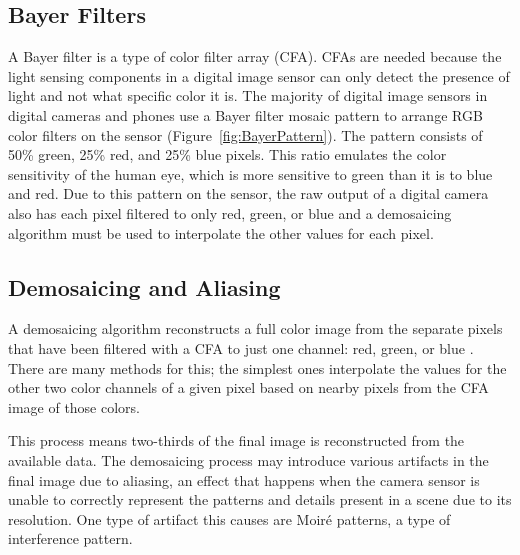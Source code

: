 \documentclass{sig-alternate}
\begin{document}

\subsection{Bayer Filters}
\label{sec:background:bayerFilter}

A Bayer filter is a type of color filter array (CFA). CFAs are needed because the light sensing components in a digital image sensor can only detect the presence of light and not what specific color it is. The majority of digital image sensors in digital cameras and phones use a Bayer filter mosaic pattern to arrange RGB color filters on the sensor (Figure~\ref{fig:BayerPattern}). The pattern consists of 50\% green, 25\% red, and 25\% blue pixels. This ratio emulates the color sensitivity of the human eye, which is more sensitive to green than it is to blue and red. Due to this pattern on the sensor, the raw output of a digital camera also has each pixel filtered to only red, green, or blue and a demosaicing algorithm must be used to interpolate the other values for each pixel.~\cite{wiki:BayerFilter}



\subsection{Demosaicing and Aliasing}
\label{sec:background:demosaicing}

A demosaicing algorithm reconstructs a full color image from the separate pixels that have been filtered with a CFA to just one channel: red, green, or blue \cite{wiki:Demosaicing}. There are many methods for this; the simplest ones interpolate the values for the other two color channels of a given pixel based on nearby pixels from the CFA image of those colors.

This process means two-thirds of the final image is reconstructed from the available data. The demosaicing process may introduce various artifacts in the final image due to aliasing, an effect that happens when the camera sensor is unable to correctly represent the patterns and details present in a scene due to its resolution. One type of artifact this causes are Moiré patterns, a type of interference pattern.~\cite{blog:Wronski2018}

\end{document}
